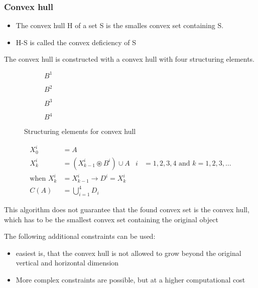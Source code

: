 \subsubsection{Convex hull}
\begin{itemize}
\item The convex hull H of a set S is the smalles convex set containing S.
\item H-S is called the convex deficiency of S
\end{itemize}
The convex hull is constructed with a convex hull with four structuring elements.
\begin{figure}[h]
	\centering
	\begin{subfigure}[b]{0.2\textwidth}
		\centering
		\caption{$B^1$}
	\end{subfigure}
	\begin{subfigure}[b]{0.2\textwidth}
		\centering
		\caption{$B^2$}
	\end{subfigure}
	\begin{subfigure}[b]{0.2\textwidth}
		\centering
		\caption{$B^3$}
	\end{subfigure}
	\begin{subfigure}[b]{0.2\textwidth}
		\centering
		\caption{$B^4$}
	\end{subfigure}
	\caption{Structuring elements for convex hull}
\end{figure}

\begin{align*}
	X_0^i &= A \\
	X_k^i &= (X_{k-1}^i \circledast B^i) \cup A & i &=1,2,3,4 \text{ and } k=1,2,3,\ldots \\
	\text{when } X_k^i &= X_{k-1}^i \longrightarrow D^i = X_k^i \\
	C(A) &= \bigcup\limits_{i=1}^4 D_i
\end{align*}

This algorithm does not guarantee that the found convex set is the convex hull, which has to be the smallest convex set containing the original object

The following additional constraints can be used:
\begin{itemize}
\item easiest is, that the convex hull is not allowed to grow beyond the original vertical and horizontal dimension
\item More complex constraints are possible, but at a higher computational cost
\end{itemize}

